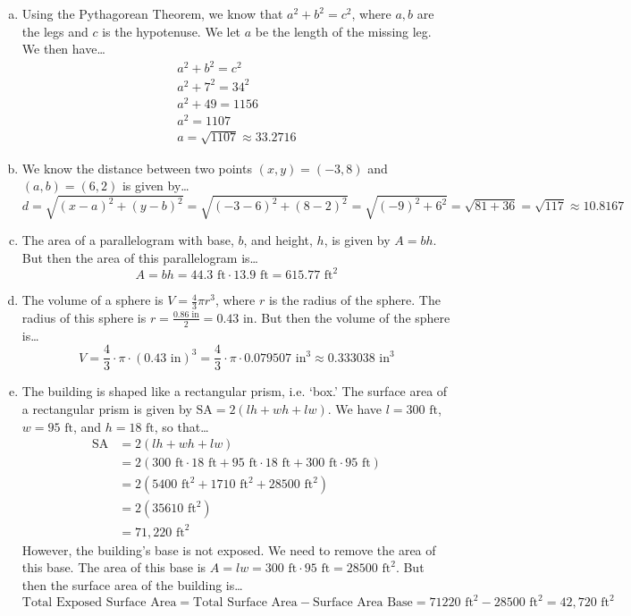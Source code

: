\documentclass[11pt,letterpaper]{article}
\begin{document}
{ \small
\sol 
\begin{enumerate}[(a)]
\item Using the Pythagorean Theorem, we know that $a^2 + b^2= c^2$, where $a, b$ are the legs and $c$ is the hypotenuse. We let $a$ be the length of the missing leg. We then have\dots
	\[
	\begin{gathered}
	a^2 + b^2= c^2 \\
	a^2 + 7^2= 34^2 \\
	a^2 + 49= 1156 \\
	a^2= 1107 \\
	a= \sqrt{1107} \approx 33.2716
	\end{gathered}
	\]

\item We know the distance between two points $(x, y)= (-3, 8)$ and $(a, b)= (6, 2)$ is given by\dots
	\[
	d= \sqrt{(x - a)^2 + (y - b)^2}= \sqrt{(-3 - 6)^2 + (8 - 2)^2}= \sqrt{(-9)^2 + 6^2}= \sqrt{81 + 36}= \sqrt{117} \approx 10.8167
	\] 

\item The area of a parallelogram with base, $b$, and height, $h$, is given by $A= bh$. But then the area of this parallelogram is\dots
	\[
	A= bh= 44.3 \text{ ft} \cdot 13.9 \text{ ft}= 615.77 \text{ ft}^2
	\]

\item The volume of a sphere is $V= \frac{4}{3} \pi r^3$, where $r$ is the radius of the sphere. The radius of this sphere is $r= \frac{0.86 \text{ in}}{2}= 0.43 \text{ in}$. But then the volume of the sphere is\dots
	\[
	V= \frac{4}{3} \cdot \pi \cdot (0.43 \text{ in})^3= \frac{4}{3} \cdot \pi \cdot 0.079507 \text{ in}^3 \approx 0.333038 \text{ in}^3
	\]

\item The building is shaped like a rectangular prism, i.e. `box.' The surface area of a rectangular prism is given by $\text{SA}= 2(lh + wh + lw)$. We have $l = 300 \text{ ft}$, $w= 95 \text{ ft}$, and $h= 18 \text{ ft}$, so that\dots
	\[
	\begin{aligned}
	\text{SA}&= 2(lh + wh + lw) \\
	&= 2 (300 \text{ ft} \cdot 18 \text{ ft} + 95 \text{ ft} \cdot 18 \text{ ft} + 300 \text{ ft} \cdot 95 \text{ ft} ) \\
	&= 2 (5400 \text{ ft}^2 + 1710 \text{ ft}^2 + 28500 \text{ ft}^2) \\
	&= 2(35610 \text{ ft}^2) \\
	&= 71,\!220 \text{ ft}^2
	\end{aligned}
	\]
However, the building's base is not exposed. We need to remove the area of this base. The area of this base is $A= lw= 300 \text{ ft} \cdot 95 \text{ ft}= 28500 \text{ ft}^2$. But then the surface area of the building is\dots
	\[
	\text{Total Exposed Surface Area}= \text{Total Surface Area} - \text{Surface Area Base}= 71220 \text{ ft}^2 - 28500 \text{ ft}^2= 42,\!720 \text{ ft}^2
	\]
\end{enumerate}
}
\end{document}
